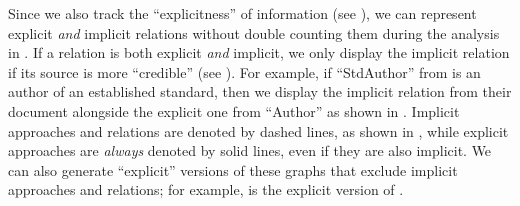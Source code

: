 
    
    \ExampleSynGraph{}

    \label{graphExplicit}
    Since we also track the ``explicitness'' of information
    (see ), we can represent explicit \emph{and} implicit
    relations without double counting them during the analysis in
    . If a relation is both explicit \emph{and} implicit,
    we only display the implicit relation if its source is more ``credible''
    (see ). For example, if ``StdAuthor'' from
     is an author of an established standard, then
    we display the implicit relation from their document alongside the explicit
    one from ``Author'' as shown in .
    Implicit approaches and relations are denoted by dashed lines, as shown in
    , while explicit approaches are
    \emph{always} denoted by solid lines, even if they are also implicit.
    We can also generate ``explicit'' versions of these graphs that exclude
    implicit approaches and relations; for example, 
    is the explicit version of %
    .

